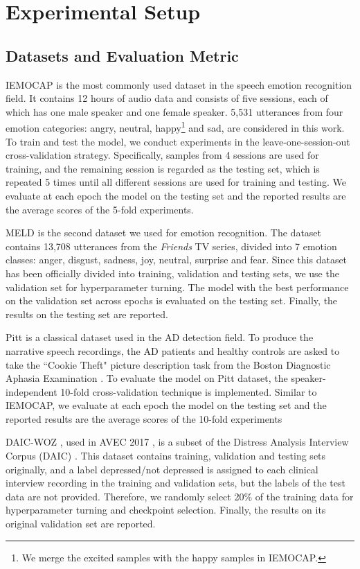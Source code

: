 \documentclass[lettersize,journal]{IEEEtran}
\begin{document}
\section{Experimental Setup}

\subsection{Datasets and Evaluation Metric}
IEMOCAP \cite{IEMOCAP} is the most commonly used dataset in the speech emotion recognition field. It contains 12 hours of audio data and consists of five sessions, each of which has one male speaker and one female speaker. 5,531 utterances from four emotion categories: angry, neutral, happy\footnote{We merge the excited samples with the happy samples in IEMOCAP.} and sad, are considered in this work. To train and test the model, we conduct experiments in the leave-one-session-out cross-validation strategy. Specifically, samples from 4 sessions are used for training, and the remaining session is regarded as the testing set, which is repeated 5 times until all different sessions are used for training and testing. We evaluate at each epoch the model on the testing set and the reported results are the average scores of the 5-fold experiments.

MELD \cite{meld} is the second dataset we used for emotion recognition. The dataset contains 13,708 utterances from the \textit{Friends} TV series, divided into 7 emotion classes: anger, disgust, sadness, joy, neutral, surprise and fear. Since this dataset has been officially divided into training, validation and testing sets, we use the validation set for hyperparameter turning. The model with the best performance on the validation set across epochs is evaluated on the testing set. Finally, the results on the testing set are reported.

Pitt \cite{pitt} is a classical dataset used in the AD detection field. To produce the narrative speech recordings, the AD patients and healthy controls are asked to take the ``Cookie Theft" picture description task from the Boston Diagnostic Aphasia Examination \cite{cookie}. To evaluate the model on Pitt dataset, the speaker-independent 10-fold cross-validation technique is implemented. Similar to IEMOCAP, we evaluate at each epoch the model on the testing set and the reported results are the average scores of the 10-fold experiments

DAIC-WOZ \cite{avec}, used in AVEC 2017 \cite{avec2017}, is a subset of the Distress Analysis Interview Corpus (DAIC) \cite{avec}. This dataset contains training, validation and testing sets originally, and a label depressed/not depressed is assigned to each clinical interview recording in the training and validation sets, but the labels of the test data are not provided. Therefore, we randomly select 20\% of the training data for hyperparameter turning and checkpoint selection. Finally, the results on its original validation set are reported.
\end{document}
